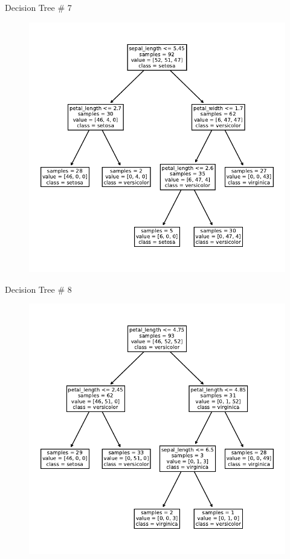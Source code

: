 \documentclass{beamer}
\begin{document}
\begin{frame}{Decision Tree \# 7}
\begin{figure}
\includegraphics[scale=0.7]{tree-7.pdf}
\end{figure}
\end{frame}


\begin{frame}{Decision Tree \# 8}
\begin{figure}
\includegraphics[scale=0.7]{tree-8.pdf}
\end{figure}
\end{frame}
\end{document}
